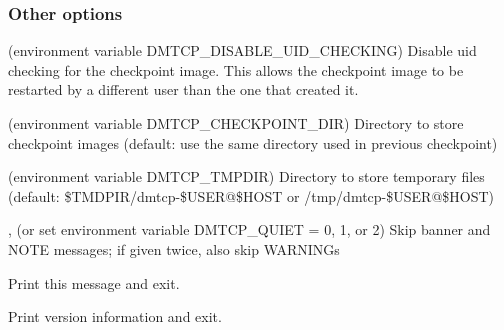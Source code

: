 \subsubsection{Other options}
\begin{Description}
  \item[\Opt{--no-strict-uid-checking} (environment variable DMTCP_DISABLE_UID_CHECKING)]
    Disable uid checking for the checkpoint image. This allows the checkpoint image
    to be restarted by a different user than the one that created it.

  \item[\OptSArg{--ckptdir}{path} (environment variable DMTCP_CHECKPOINT_DIR)]
    Directory to store checkpoint images (default: use the same directory used in previous checkpoint)
  \item[\OptSArg{--tmpdir}{path} (environment variable DMTCP_TMPDIR)]
    Directory to store temporary files
    (default: \$TMDPIR/dmtcp-\$USER@\$HOST or /tmp/dmtcp-\$USER@\$HOST)
  \item[\Opt{-q}, \Opt{--quiet} (or set environment variable DMTCP_QUIET = 0, 1, or 2)]
    Skip banner and NOTE messages; if given twice, also skip WARNINGs
  \item[\Opt{--help}] Print this message and exit.
  \item[\Opt{--version}] Print version information and exit.
\end{Description}
